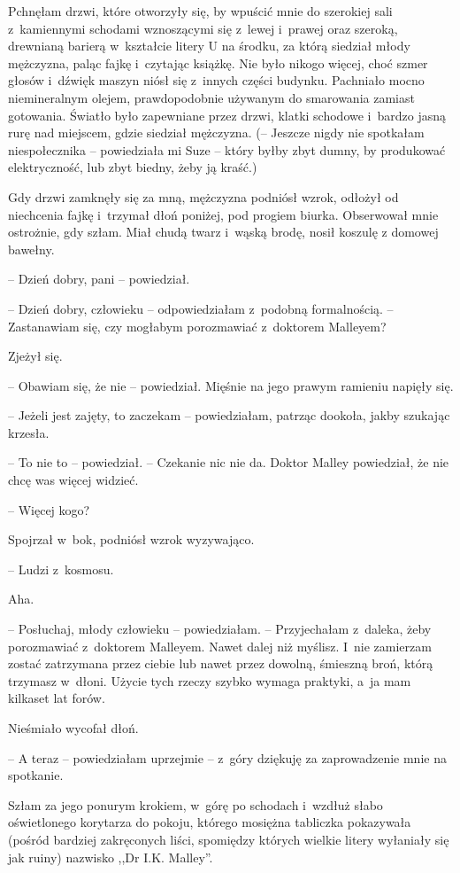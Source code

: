 \documentclass[oneside,polish,11pt,sfheadings]{mwbk}
\begin{document}
Pchnęłam drzwi, które otworzyły się, by wpuścić mnie do szerokiej sali z~kamiennymi schodami wznoszącymi się z~lewej i~prawej oraz szeroką,
drewnianą barierą w~kształcie litery U na środku, za którą siedział
młody mężczyzna, paląc fajkę i~czytając książkę. Nie było nikogo więcej,
choć szmer głosów i~dźwięk maszyn niósł się z~innych części budynku.
Pachniało mocno niemineralnym olejem, prawdopodobnie używanym do
smarowania zamiast gotowania. Światło było zapewniane przez drzwi,
klatki schodowe i~bardzo jasną rurę nad miejscem, gdzie siedział
mężczyzna. (-- Jeszcze nigdy nie spotkałam niespołecznika -- powiedziała
mi Suze -- który byłby zbyt dumny, by produkować elektryczność, lub zbyt
biedny, żeby ją kraść.)

Gdy drzwi zamknęły się za mną, mężczyzna podniósł wzrok, odłożył od
niechcenia fajkę i~trzymał dłoń poniżej, pod progiem biurka. Obserwował
mnie ostrożnie, gdy szłam. Miał chudą twarz i~wąską brodę, nosił koszulę
z domowej bawełny.

-- Dzień dobry, pani -- powiedział.

-- Dzień dobry, człowieku -- odpowiedziałam z~podobną formalnością. -- Zastanawiam się, czy mogłabym porozmawiać z~doktorem Malleyem?

Zjeżył się. 

-- Obawiam się, że nie -- powiedział. Mięśnie na jego prawym
ramieniu napięły się.

-- Jeżeli jest zajęty, to zaczekam -- powiedziałam, patrząc dookoła, jakby
szukając krzesła.

-- To nie to -- powiedział. -- Czekanie nic nie da. Doktor Malley
powiedział, że nie chcę was więcej widzieć.

-- Więcej kogo?

Spojrzał w~bok, podniósł wzrok wyzywająco.

-- Ludzi z~kosmosu.

Aha.

-- Posłuchaj, młody człowieku -- powiedziałam. -- Przyjechałam z~daleka,
żeby porozmawiać z~doktorem Malleyem. Nawet dalej niż myślisz. I~nie
zamierzam zostać zatrzymana przez ciebie lub nawet przez dowolną,
śmieszną broń, którą trzymasz w~dłoni. Użycie tych rzeczy szybko wymaga
praktyki, a~ja mam kilkaset lat forów.

Nieśmiało wycofał dłoń.

-- A teraz -- powiedziałam uprzejmie -- z~góry dziękuję za zaprowadzenie
mnie na spotkanie.

Szłam za jego ponurym krokiem, w~górę po schodach i~wzdłuż słabo
oświetlonego korytarza do pokoju, którego mosiężna tabliczka pokazywała
(pośród bardziej zakręconych liści, spomiędzy których wielkie litery
wyłaniały się jak ruiny) nazwisko ,,Dr I.K. Malley''.
\end{document}
